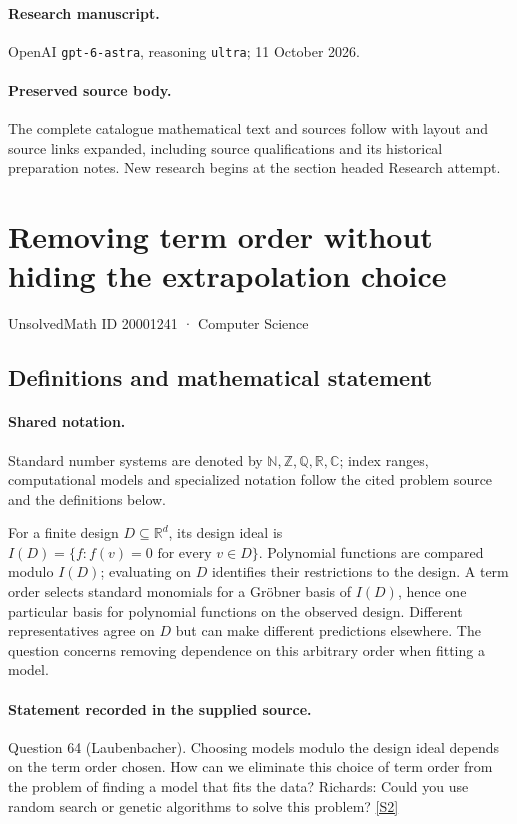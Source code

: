 \documentclass[11pt]{article}
\begin{document}
\paragraph{Research manuscript.} OpenAI \texttt{gpt-6-astra}, reasoning \texttt{ultra}; 11 October 2026.
\paragraph{Preserved source body.} The complete catalogue mathematical text and sources follow with layout and source links expanded, including source qualifications and its historical preparation notes. New research begins at the section headed Research attempt.

\section{Removing term order without hiding the extrapolation choice}\label{20001241}
{\small UnsolvedMath ID 20001241 · Computer Science}
\subsection{Definitions and mathematical statement}

\paragraph{Shared notation.}Standard number systems are denoted by $\mathbb N,\mathbb Z,\mathbb Q,\mathbb R,\mathbb C$; index ranges, computational models and specialized notation follow the cited problem source and the definitions below.


For a finite design $D\subseteq\mathbb R^d$, its design ideal is $I(D)=\{f:f(v)=0\text{ for every }v\in D\}$. Polynomial functions are compared modulo $I(D)$; evaluating on $D$ identifies their restrictions to the design. A term order selects standard monomials for a Gröbner basis of $I(D)$, hence one particular basis for polynomial functions on the observed design. Different representatives agree on $D$ but can make different predictions elsewhere. The question concerns removing dependence on this arbitrary order when fitting a model.
\paragraph{Statement recorded in the supplied source.}
Question 64 (Laubenbacher). Choosing models modulo the design ideal depends on the term order chosen. How can we eliminate this choice of term order from the problem of finding a model that fits the data? Richards: Could you use random search or genetic algorithms to solve this problem? \href{https://aimath.org/WWN/compalgstat/compalgstat.pdf}{[S2]}
\end{document}
